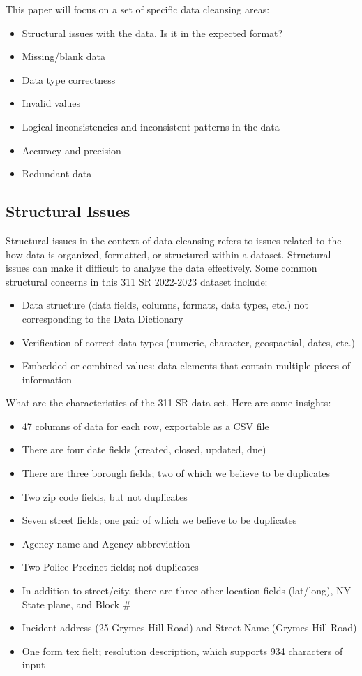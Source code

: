 \documentclass[12pt, titlepage]{article}
\begin{document}
This paper will focus on a set of specific data cleansing areas:

\begin{itemize}
	\item Structural issues with the data. Is it in the expected format?
	\item Missing/blank data
	\item Data type correctness
	\item Invalid values
	\item Logical inconsistencies and inconsistent patterns in the data
	\item Accuracy and precision
	\item Redundant data  
\end{itemize}

\subsection{Structural Issues}

Structural issues in the context of data cleansing refers to issues related to the how data is organized, formatted, or structured within a dataset. Structural issues 
can make it difficult to analyze the data effectively. Some common structural concerns in this 311 SR 2022-2023 dataset include:

\begin{itemize}
	\item Data structure (data fields, columns, formats, data types, etc.) not corresponding to the Data Dictionary
	\item Verification of correct data types (numeric, character, geospactial, dates, etc.)
	\item Embedded or combined values: data elements that contain multiple pieces of information 
\end{itemize}

What are the characteristics of the 311 SR data set. Here are some insights:

\begin{itemize}
	\item 47 columns of data for each row, exportable as a CSV file
	\item There are four date fields (created, closed, updated, due)
	\item There are three borough fields; two of which we believe to be duplicates
	\item Two zip code fields, but not duplicates
	\item Seven street fields; one pair of which we believe to be duplicates
	\item Agency name and Agency abbreviation
	\item Two Police Precinct fields; not duplicates
	\item In addition to street/city, there are three other location fields (lat/long), NY State plane, and Block \#
	\item Incident address (25 Grymes Hill Road) and Street Name (Grymes Hill Road)
	\item One form tex fielt; resolution description, which supports 934 characters of input
\end{itemize}
\end{document}
